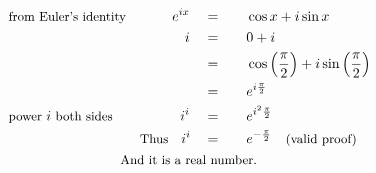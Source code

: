 \begin{alignat*}{5}
&\small\text{from Euler's identity}&e^{ix}\quad&=\quad&&\cos{x}+i\sin{x}\\
&\,&i\quad&=&&0+i\\
&\,&\,&=&&\cos{\left(\frac{\pi}{2}\right)}+i\sin{\left(\frac{\pi}{2}\right)}\\
&\,&\,&=&&e^{i\frac{\pi}{2}}\\
&\small\text{power }i\text{ both sides}&i^i\quad&=&& e^{i^2\frac{\pi}{2}}\\
&\,&\small\text{Thus}\quad i^i\quad&=&&e^{-\frac{\pi}{2}}\quad\small\text{(valid proof)}\\
&\rlap{\qquad\qquad\qquad\qquad\small\text{And it is a real number.}}
\end{alignat*}
